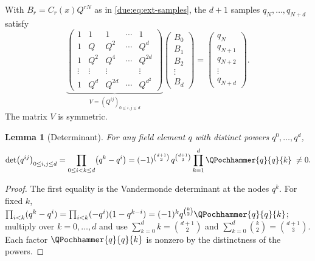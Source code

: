 \documentclass[11pt,oneside]{article}
\theoremstyle{plain}
\newtheorem{lemma}[theorem]{Lemma}
\theoremstyle{definition}
\theoremstyle{remark}
\newcommand{\upn}[1]{\RvachevUp_{#1}}
\newcommand{\Qq}{Q}                                         %
\newcommand{\Cr}[2]{C_{#1}\!\left(#2\right)}                %
\newcommand{\qn}[1]{q_{#1}}                                 %
\begin{document}
With $B_{r}=\Cr{r}{x}\Qq^{rN}$ as in \cref{due:eq:ext-samples}, the $d+1$
samples $\qn{N},\ldots,\qn{N+d}$ satisfy
\begin{equation}
 \underbrace{\begin{pmatrix}
  1&1&1&\cdots&1\\
  1&\Qq&\Qq^{2}&\cdots&\Qq^{d}\\
  1&\Qq^{2}&\Qq^{4}&\cdots&\Qq^{2d}\\
  \vdots&\vdots&\vdots&&\vdots\\
  1&\Qq^{d}&\Qq^{2d}&\cdots&\Qq^{d^{2}}
 \end{pmatrix}}_{V=(\Qq^{ij})_{0\le i,j\le d}}
 \begin{pmatrix}B_{0}\\B_{1}\\B_{2}\\\vdots\\B_{d}\end{pmatrix}
 =\begin{pmatrix}\qn{N}\\\qn{N+1}\\\qn{N+2}\\\vdots\\\qn{N+d}\end{pmatrix}.
 \label{due:eq:rec-vandermonde}
\end{equation}
The matrix $V$ is symmetric.

\begin{lemma}[Determinant]
\label{due:lem:rec-det}
For any field element $q$ with distinct powers $q^{0},\ldots,q^{d}$,
\begin{equation}
 \det\bigl(q^{ij}\bigr)_{0\le i,j\le d}
 =\prod_{0\le i<k\le d}\bigl(q^{k}-q^{i}\bigr)
 =(-1)^{\binom{d+1}{2}}\,q^{\binom{d+1}{3}}\prod_{k=1}^{d}\QPochhammer{q}{q}{k}
 \;\neq0.
 \label{due:eq:rec-det}
\end{equation}
\end{lemma}

\begin{proof}
The first equality is the Vandermonde determinant at the nodes $q^{k}$.  For
fixed $k$, $\prod_{i<k}(q^{k}-q^{i})=\prod_{i<k}(-q^{i})(1-q^{k-i})
=(-1)^{k}q^{\binom{k}{2}}\QPochhammer{q}{q}{k}$; multiply over
$k=0,\ldots,d$ and use $\sum_{k=0}^{d}k=\binom{d+1}{2}$ and
$\sum_{k=0}^{d}\binom{k}{2}=\binom{d+1}{3}$.  Each factor
$\QPochhammer{q}{q}{k}$ is nonzero by the distinctness of the powers.
\end{proof}
\end{document}
